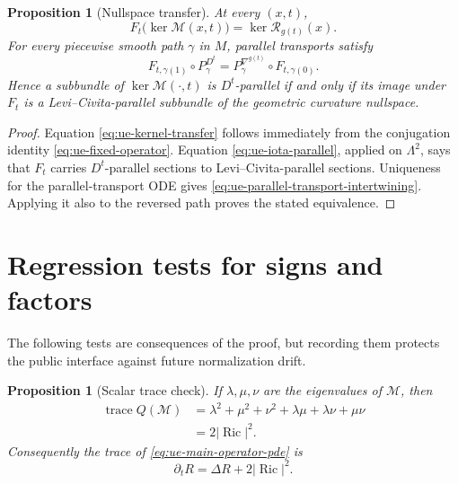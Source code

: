 \documentclass[10pt]{coll-l}
\newcommand{\trace}{\operatorname{trace}}
\newtheorem{proposition}[theorem]{Proposition}
\theoremstyle{definition}
\theoremstyle{remark}
\numberwithin{section}{chapter}
\numberwithin{equation}{chapter}
\newcommand{\Ric}{\operatorname{Ric}}
\begin{document}
\begin{proposition}[Nullspace transfer]
\label{prop:ue-nullspace-transfer}
At every $(x,t)$,
\begin{equation}
 F_t\bigl(\ker\mathcal M(x,t)\bigr)
       =\ker\mathcal R_{g(t)}(x).                        \label{eq:ue-kernel-transfer}
\end{equation}
For every piecewise smooth path $\gamma$ in $M$, parallel transports satisfy
\begin{equation}
 F_{t,\gamma(1)}\circ P^{D^t}_\gamma
   =P^{\nabla^{g(t)}}_\gamma\circ F_{t,\gamma(0)}.       \label{eq:ue-parallel-transport-intertwining}
\end{equation}
Hence a subbundle of $\ker\mathcal M(\cdot,t)$ is $D^t$-parallel if and
only if its image under $F_t$ is a Levi--Civita-parallel subbundle of the
geometric curvature nullspace.
\end{proposition}

\begin{proof}
Equation \eqref{eq:ue-kernel-transfer} follows immediately from the
conjugation identity \eqref{eq:ue-fixed-operator}.  Equation
\eqref{eq:ue-iota-parallel}, applied on $\Lambda^2$, says that $F_t$ carries
$D^t$-parallel sections to Levi--Civita-parallel sections.  Uniqueness for
the parallel-transport ODE gives
\eqref{eq:ue-parallel-transport-intertwining}.  Applying it also to the
reversed path proves the stated equivalence.
\end{proof}

\section{Regression tests for signs and factors}
\label{sec:ue-regression}

The following tests are consequences of the proof, but recording them
protects the public interface against future normalization drift.

\begin{proposition}[Scalar trace check]
\label{prop:ue-scalar-trace-check}
If $\lambda,\mu,\nu$ are the eigenvalues of $\mathcal M$, then
\begin{align}
 \trace Q(\mathcal M)
 &=\lambda^2+\mu^2+\nu^2
     +\lambda\mu+\lambda\nu+\mu\nu                    \label{eq:ue-trace-Q}\\
 &=2|\Ric|^2.                                            \label{eq:ue-trace-Q-ricci}
\end{align}
Consequently the trace of \eqref{eq:ue-main-operator-pde} is
\[
                   \partial_tR=\Delta R+2|\Ric|^2.
\]
\end{proposition}
\end{document}
